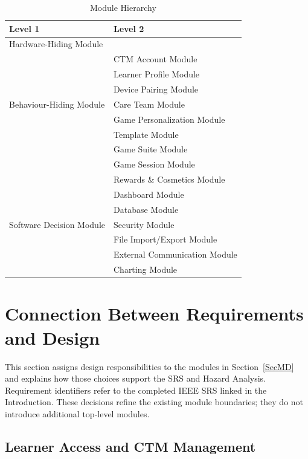 \documentclass[12pt, titlepage]{article}
\begin{document}
\begin{table}[H]
\centering
\begin{tabular}{p{} p{}}
\toprule
\textbf{Level 1} & \textbf{Level 2}\\
\midrule

{Hardware-Hiding Module} & ~ \\
\midrule

\multirow{7}{0.3\textwidth}{Behaviour-Hiding Module}
& CTM Account Module\\
& Learner Profile Module\\
& Device Pairing Module\\
& Care Team Module\\
& Game Personalization Module\\
& Template Module\\ 
& Game Suite Module\\
& Game Session Module\\
& Rewards \& Cosmetics Module\\
& Dashboard Module\\
\midrule

\multirow{3}{0.3\textwidth}{Software Decision Module}
& Database Module\\
& Security Module\\
& File Import/Export Module\\
& External Communication Module\\
& Charting Module\\
\bottomrule

\end{tabular}
\caption{Module Hierarchy}
\label{TblMH}
\end{table}

\section{Connection Between Requirements and Design}
\label{SecConnection}

This section assigns design responsibilities to the modules in
Section~\ref{SecMD} and explains how those choices support the SRS and
Hazard Analysis. Requirement identifiers refer to the completed IEEE SRS
linked in the Introduction. These decisions refine the existing module
boundaries; they do not introduce additional top-level modules.

\subsection*{Learner Access and CTM Management}
\end{document}
